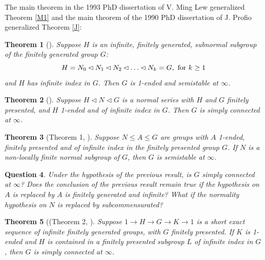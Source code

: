 \documentclass[12pt]{article}
\newtheorem{theorem}{Theorem}[subsection]
\newtheorem{question}[theorem]{Question}
\begin{document}
 

The main theorem in the 1993 PhD dissertation of V. Ming Lew generalized Theorem \ref{M1} and the main theorem of the 1990 PhD dissertation of J. Profio generalized Theorem \ref{J}: 

\begin{theorem} [\cite{Lew93}] \label{L}
Suppose $H$ is an infinite,  finitely generated, subnormal subgroup of the finitely generated group $G$: 
$$H = N_0 \lhd N_1 \lhd N_2 \lhd \ldots  \lhd N_k = G, \hbox{ for } k\geq 1$$
and $H$ has infinite index in $G$. Then $G$ is 1-ended and semistable at $\infty$. 
\end{theorem}

\begin{theorem} [\cite{P90}] \label{P}
Suppose $H\lhd N\lhd G$ is a normal series with $H$ and $G$ finitely presented, and $H$ 1-ended and of infinite index in $G$. Then $G$ is simply connected at $\infty$.
\end{theorem}

\begin{theorem} [Theorem 1, \cite{MMSS96}]
Suppose $N\leq A\leq G$ are groups with $A$ 1-ended, finitely presented and of infinite index in the finitely presented group $G$. If $N$ is a non-locally finite normal subgroup of $G$, then $G$ is semistable at $\infty$. 
\end{theorem}

\begin{question}
Under the hypothesis of the previous result, is $G$ simply connected at $\infty$? Does the conclusion of the previous result remain true if the hypothesis on $A$ is replaced by $A$ is finitely generated and infinite? What if the normality hypothesis on $N$ is replaced by subcommensurated? 
\end{question}

\begin{theorem} [(Theorem 2, \cite{MMSS96}] \label{Subset}  
Suppose $1\to H\to G\to K\to 1$ is a short exact sequence of infinite finitely generated groups, with $G$ finitely presented. If $K$ is 1-ended and $H$ is contained in a finitely presented subgroup $L$ of infinite index in $G$, then $G$ is simply connected at $\infty$.
\end{theorem}
\end{document}
